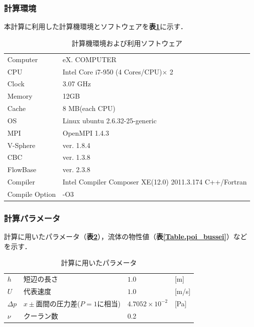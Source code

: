 \subsubsection{計算環境}
本計算に利用した計算機環境とソフトウェアを\textbf{表\ref{tbl: 2dpoiseuille env}}に示す．

\begin{table}[htdp]
\small
\caption{計算機環境および利用ソフトウェア}
\begin{center}
\begin{tabular}{ll}\toprule
Computer & eX. COMPUTER\\
CPU & Intel Core i7-950 (4 Cores/CPU)$\times$ 2\\
Clock & 3.07 GHz\\
Memory & 12GB \\
Cache & 8 MB(each CPU)\\
OS & Linux ubuntu 2.6.32-25-generic\\ \hline
MPI & OpenMPI 1.4.3\\
V-Sphere & ver. 1.8.4\\
CBC & ver. 1.3.8\\
FlowBase & ver. 2.3.8\\ \hline
Compiler & Intel Compiler Composer XE(12.0) 2011.3.174 C++/Fortran\\
Compile Option & -O3\\
\bottomrule
\end{tabular}
\end{center}
\label{tbl: 2dpoiseuille env}
\end{table}


%
\subsubsection{計算パラメータ}
計算に用いたパラメータ（\textbf{表\ref{Table.poi_param}}），流体の物性値（\textbf{表\ref{Table.poi_bussei}}）などを示す．
\begin{table}[htbp]
\centering
\caption{計算に用いたパラメータ}
\label{Table.poi_param}
\begin{tabular}{llll}\toprule
$h$ &短辺の長さ &$1.0$ &[m]\\
$U$ &代表速度 & $1.0$ &[m/s]\\
$\Delta p$ &$x\pm$面間の圧力差($P=1$に相当) &$4.7052\times10^{-2}$ &[Pa]\\
$\nu $ & クーラン数 & 0.2 & \\
\bottomrule
\end{tabular}
\end{table}


